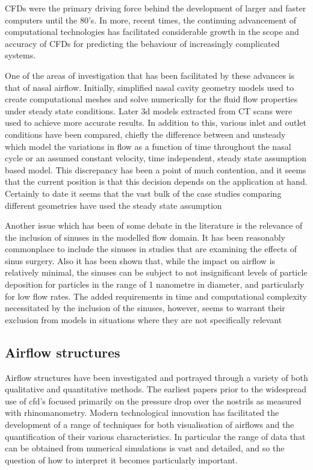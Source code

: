 \documentclass{article}
\begin{document}
CFDs were the primary driving force behind the development of larger and faster computers until the 80's\cite{Wendt2009}. In more, recent times, the continuing advancement of computational technologies has facilitated considerable growth in the scope and accuracy of CFDs for predicting the behaviour of increasingly complicated systems\cite{Tu2008}. 

One of the areas of investigation that has been facilitated by these advances is that of nasal airflow. Initially, simplified nasal cavity geometry models used to create computational meshes and solve numerically for the fluid flow properties under steady state conditions\cite{Keyhani1995, Hahn1993}. Later 3d models extracted from CT scans were used to achieve more accurate results\cite{Martonen2002}. In addition to this, various inlet and outlet conditions have been compared, chiefly the difference between and unsteady  which model the variations in flow as a function of time throughout the nasal cycle\cite{Shi2006} or an assumed constant velocity, time independent, steady state assumption based model\cite{Wen2008}. This discrepancy has been a point of much contention, and it seems that the current position is that this decision depends on the application at hand\cite{Doorly2008c}. Certainly to date it seems that the vast bulk of the case studies comparing different geometries have used the steady state assumption\cite{Xi2012, Zhu2011, Garcia2007}

Another issue which has been of some debate in the literature is the relevance of the inclusion of sinuses in the modelled flow domain. It has been reasonably commonplace to include the sinuses in studies that are examining the effects of sinus surgery\cite{Xiong2008a, Lindemann2005}. Also it has been shown that, while the impact on airflow is relatively minimal, the sinuses can be subject to not insignificant levels of particle deposition for particles in the range of 1 nanometre in diameter, and particularly for low flow rates\cite{Ge2012}. The added  requirements in time and computational complexity necessitated by the inclusion of the sinuses, however, seems to warrant their exclusion from models in situations where they are not specifically relevant\cite{Doorly2008c}



\subsection{Airflow structures}
Airflow structures have been investigated and portrayed through a variety of both qualitative and quantitative methods. The earliest papers prior to the widespread use of cfd's focused primarily on the pressure drop over the nostrils as measured with rhinomanometry\cite{Martin1981}. Modern technological innovation has facilitated the development of a range of techniques for both visualisation of airflows and the quantification of their various characteristics. In particular the range of data that can be obtained from numerical simulations is vast and detailed, and so the question of how to interpret it becomes particularly important.
\end{document}
